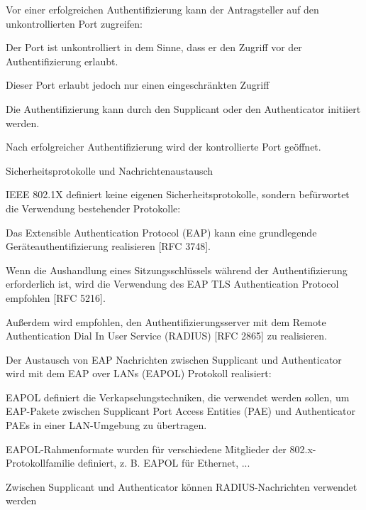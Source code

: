 \documentclass[a4paper]{article}
\begin{document}
\begin{multicols}{3}
\begin{itemize*}
            \begin{itemize*}
                  \item Vor einer erfolgreichen Authentifizierung kann der Antragsteller auf den unkontrollierten Port zugreifen:
                  \begin{itemize*} \item Der Port ist unkontrolliert in dem Sinne, dass er den Zugriff vor der Authentifizierung erlaubt. \item Dieser Port erlaubt jedoch nur einen eingeschränkten Zugriff \end{itemize*}
                  \item Die Authentifizierung kann durch den Supplicant oder den Authenticator initiiert werden.
                  \item Nach erfolgreicher Authentifizierung wird der kontrollierte Port geöffnet.
            \end{itemize*}
      \end{itemize*}

      Sicherheitsprotokolle und Nachrichtenaustausch

      \begin{itemize*}
            \item
            IEEE 802.1X definiert keine eigenen Sicherheitsprotokolle, sondern
            befürwortet die Verwendung bestehender Protokolle:

            \begin{itemize*}
                  \item Das Extensible Authentication Protocol (EAP) kann eine grundlegende Geräteauthentifizierung realisieren {[}RFC 3748{]}.
                  \item Wenn die Aushandlung eines Sitzungsschlüssels während der Authentifizierung erforderlich ist, wird die Verwendung des EAP TLS Authentication Protocol empfohlen {[}RFC 5216{]}.
                  \item Außerdem wird empfohlen, den Authentifizierungsserver mit dem Remote Authentication Dial In User Service (RADIUS) {[}RFC 2865{]} zu realisieren.
            \end{itemize*}
            \item
            Der Austausch von EAP Nachrichten zwischen Supplicant und
            Authenticator wird mit dem EAP over LANs (EAPOL) Protokoll realisiert:

            \begin{itemize*}
                  \item EAPOL definiert die Verkapselungstechniken, die verwendet werden sollen, um EAP-Pakete zwischen Supplicant Port Access Entities (PAE) und Authenticator PAEs in einer LAN-Umgebung zu übertragen.
                  \item EAPOL-Rahmenformate wurden für verschiedene Mitglieder der 802.x-Protokollfamilie definiert, z. B. EAPOL für Ethernet, ...
                  \item Zwischen Supplicant und Authenticator können RADIUS-Nachrichten verwendet werden
            \end{itemize*}
      \end{itemize*}


\end{multicols}
\end{document}
